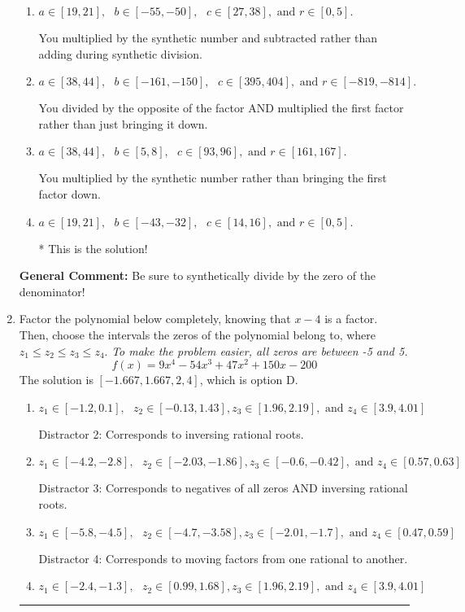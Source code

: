\documentclass{extbook}[14pt]
\newcommand{\litem}[1]{\item #1

\rule{\textwidth}{0.4pt}}
\begin{document}
\begin{enumerate}
{\begin{enumerate}[label=\Alph*.]
 You divided by the opposite of the factor.
\item \( a \in [19, 21], \text{   } b \in [-55, -50], \text{   } c \in [27, 38], \text{   and   } r \in [0, 5]. \)

 You multiplied by the synthetic number and subtracted rather than adding during synthetic division.
\item \( a \in [38, 44], \text{   } b \in [-161, -150], \text{   } c \in [395, 404], \text{   and   } r \in [-819, -814]. \)

 You divided by the opposite of the factor AND multiplied the first factor rather than just bringing it down.
\item \( a \in [38, 44], \text{   } b \in [5, 8], \text{   } c \in [93, 96], \text{   and   } r \in [161, 167]. \)

 You multiplied by the synthetic number rather than bringing the first factor down.
\item \( a \in [19, 21], \text{   } b \in [-43, -32], \text{   } c \in [14, 16], \text{   and   } r \in [0, 5]. \)

* This is the solution!
\end{enumerate}

\textbf{General Comment:} Be sure to synthetically divide by the zero of the denominator!
}
\litem{
Factor the polynomial below completely, knowing that $x -4$ is a factor. Then, choose the intervals the zeros of the polynomial belong to, where $z_1 \leq z_2 \leq z_3 \leq z_4$. \textit{To make the problem easier, all zeros are between -5 and 5.}
\[ f(x) = 9x^{4} -54 x^{3} +47 x^{2} +150 x -200 \]The solution is \( [-1.667, 1.667, 2, 4] \), which is option D.\begin{enumerate}[label=\Alph*.]
\item \( z_1 \in [-1.2, 0.1], \text{   }  z_2 \in [-0.13, 1.43], z_3 \in [1.96, 2.19], \text{   and   } z_4 \in [3.9, 4.01] \)

 Distractor 2: Corresponds to inversing rational roots.
\item \( z_1 \in [-4.2, -2.8], \text{   }  z_2 \in [-2.03, -1.86], z_3 \in [-0.6, -0.42], \text{   and   } z_4 \in [0.57, 0.63] \)

 Distractor 3: Corresponds to negatives of all zeros AND inversing rational roots.
\item \( z_1 \in [-5.8, -4.5], \text{   }  z_2 \in [-4.7, -3.58], z_3 \in [-2.01, -1.7], \text{   and   } z_4 \in [0.47, 0.59] \)

 Distractor 4: Corresponds to moving factors from one rational to another.
\item \( z_1 \in [-2.4, -1.3], \text{   }  z_2 \in [0.99, 1.68], z_3 \in [1.96, 2.19], \text{   and   } z_4 \in [3.9, 4.01] \)


\end{enumerate}}
\end{enumerate}
\end{document}
